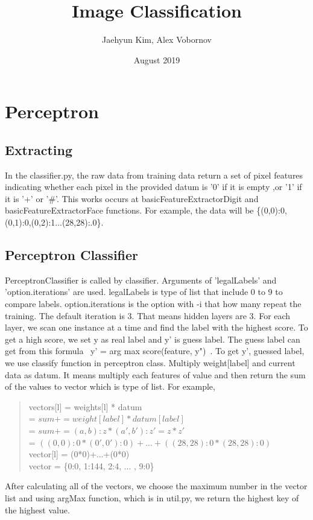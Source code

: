\documentclass{article}
\title{Image Classification}
\author{Jaehyun Kim, Alex Vobornov}
\date{August 2019}
\begin{document}
\maketitle

\section{Perceptron}
    \subsection{Extracting}
        \hspace*{10mm}In the classifier.py, the raw data from training data return a set of pixel features indicating whether each pixel in the provided datum is '0' if it is empty ,or '1' if it is '+' or '\#'. This works occurs at basicFeatureExtractorDigit and basicFeatureExtractorFace functions. For example, the data will be \{(0,0):0,(0,1):0,(0,2):1...(28,28):.0\}. 
   
    \subsection{Perceptron Classifier}
        \hspace*{10mm}PerceptronClassifier is called by classifier. Arguments of 'legalLabels' and 'option.iterations' are used. legalLabels is type of list that include 0 to 9 to compare labels. option.iterations is the option with -i that how many repeat the training. The default iteration is 3. That means hidden layers are 3. \newline
        For each layer, we scan one instance at a time and find the label with the highest score. To get a high score, we set y as real label and y' is guess label. The guess label can get from this formula \ y' = arg max score(feature, y")\ . \newline
        To get y', guessed label, we use classify function in perceptron class. Multiply weight[label] and current data as datum. It means multiply each features of value and then return the sum of the values to vector which is type of list. 
        For example,  
        \begin{quote}
            vectors[l] = weights[l] * datum\\
            = $sum += weight[label] * datum[label]$\\
            = $sum += (a,b):z * (a',b'):z' = z * z'$\\
            = $((0,0):0 * (0',0'):0)+...+((28,28):0 * (28,28):0)$\\
            vector[l] = (0*0)+...+(0*0)\\
            vector = \{0:0, 1:144, 2:4, ... , 9:0\}
        \end{quote}
        After calculating all of the vectors, we choose the maximum number in the vector list and using argMax function, which is in util.py, we return the highest key of the highest value.
        
\end{document}
